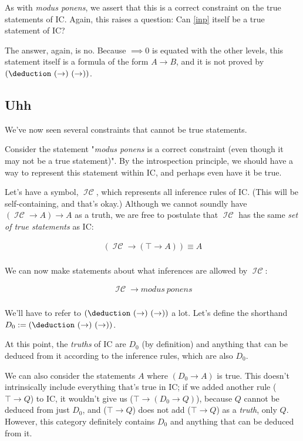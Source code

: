 \documentclass{article}
\begin{document}
  As with \emph{modus ponens}, we assert that this is a correct constraint on the true statements of IC. Again, this raises a question: Can \eqref{inp} itself be a true statement of IC?
  
  The answer, again, is no. Because $\implies{0}$ is equated with the other levels, this statement itself is a formula of the form $A \to B$, and it is not proved by $(\deduction\ (\to)\ (\to))$.
  
  
  \subsection{Uhh}
  
  We've now seen several constraints that cannot be true statements.
  
  Consider the statement "\emph{modus ponens} is a correct constraint (even though it may not be a true statement)". By the introspection principle, we should have a way to represent this statement within IC, and perhaps even have it be true.
  
  \newcommand{\icset}{\operatorname{\mathcal{IC}}}
  Let's have a symbol, $\icset$, which represents all inference rules of IC. (This will be self-containing, and that's okay.) Although we cannot soundly have $(\icset \to A) \to A$ as a truth, we are free to postulate that $\icset$ has the same \emph{set of true statements} as IC:
  
  \begin{align*}
    (\icset \to (\top \to A)) \equiv A\\
  \end{align*}
  
  We can now make statements about what inferences are allowed by $\icset$:
  
  \begin{align*}
    \icset \to modus\ ponens\\
  \end{align*}

  
  We'll have to refer to $(\deduction\ (\to)\ (\to))$ a lot. Let's define the shorthand $D_0 := (\deduction\ (\to)\ (\to))$.
  
  At this point, the \emph{truths} of IC are $D_0$ (by definition) and anything that can be deduced from it according to the inference rules, which are also $D_0$.
  
  We can also consider the statements $A$ where $(D_0 \to A)$ is true. This doesn't intrinsically include everything that's true in IC; if we added another rule ($\top \to Q$) to IC, it wouldn't give us ($\top \to (D_0 \to Q)$), because $Q$ cannot be deduced from just $D_0$, and ($\top \to Q$) does not add ($\top \to Q$) as a \emph{truth}, only $Q$. However, this category definitely contains $D_0$ and anything that can be deduced from it.
  
\end{document}
